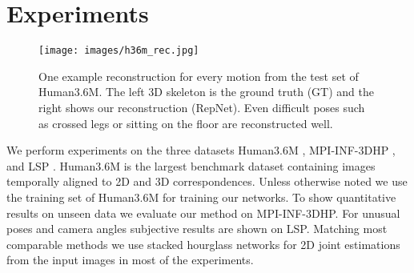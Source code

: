 \documentclass[10pt,twocolumn,letterpaper]{article}
\begin{document}
\section{Experiments}
\begin{figure*}[htp]
	\centering
	\texttt{[image: images/h36m\_rec.jpg]}
	\caption{One example reconstruction for every motion from the test set of Human3.6M. The left 3D skeleton is the ground truth (GT) and the right shows our reconstruction (RepNet). Even difficult poses such as crossed legs or sitting on the floor are reconstructed well.}
	\label{fig:h36m_rec_results}
\end{figure*}
We perform experiments on the three datasets Human3.6M \cite{h36m_pami}, MPI-INF-3DHP \cite{mpii3dhp2017}, and LSP \cite{LeadsSports2010}.
Human3.6M is the largest benchmark dataset containing images temporally aligned to 2D and 3D correspondences.
Unless otherwise noted we use the training set of Human3.6M for training our networks.
To show quantitative results on unseen data we evaluate our method on MPI-INF-3DHP.
For unusual poses and camera angles subjective results are shown on LSP.
Matching most comparable methods we use stacked hourglass networks \cite{StackedHourglassNewell2016} for 2D joint estimations from the input images in most of the experiments.
\end{document}
